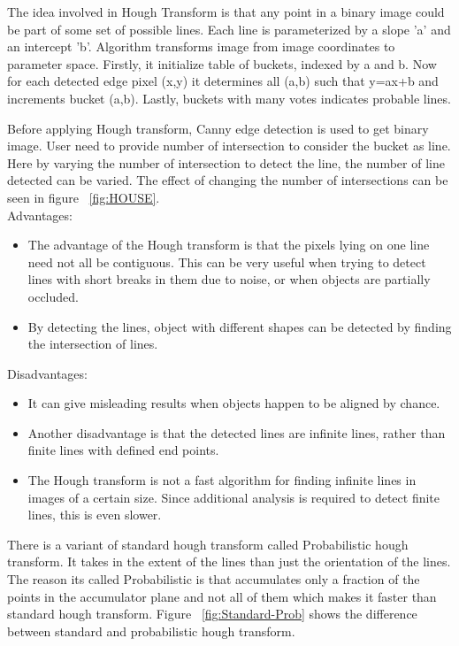 \documentclass[11pt]{article}
\begin{document}
The idea involved in Hough Transform is that any point in a binary image could be part of some set of possible lines. Each line is parameterized by a slope 'a' and an intercept 'b'. Algorithm transforms  image from image coordinates to parameter space. Firstly, it initialize table of buckets, indexed by a and b. Now for each detected edge pixel (x,y) it determines all (a,b) such that y=ax+b and increments bucket (a,b). Lastly, buckets with many votes indicates probable lines.

Before applying Hough transform, Canny edge detection is used to get binary image. User need to provide number of intersection to consider the bucket as line. Here by varying the number of intersection to detect the line, the number of line detected can be varied. The effect of changing the number of intersections can be seen in figure ~\ref{fig:HOUSE}. \\
Advantages:
\begin{itemize}[itemsep=0em]
\item The advantage of the Hough transform is that the pixels lying on one line need not all be contiguous. This can be very useful when trying to detect lines with short breaks in them due to noise, or when objects are partially occluded. 
\item By detecting the lines, object with different shapes can be detected by finding the intersection of lines.

\end{itemize}
Disadvantages:
\begin{itemize}[itemsep=0em]
\item It can give misleading results when objects happen to be aligned by chance.
\item 
Another disadvantage is that the detected lines are
infinite lines, rather than finite lines with defined end points.
\item
The Hough transform is not a fast algorithm for finding infinite lines in images of a certain size. Since additional analysis is required to detect finite lines, this is even slower. 

\end{itemize}
 

There is a variant of standard hough transform called Probabilistic hough transform. It takes in the extent of the lines than just the orientation of the lines. The reason its called Probabilistic is that accumulates only a fraction of the points in the accumulator plane and not all of them which makes it faster than standard hough transform. Figure ~\ref{fig:Standard-Prob} shows the difference between standard and probabilistic hough transform.
\end{document}
